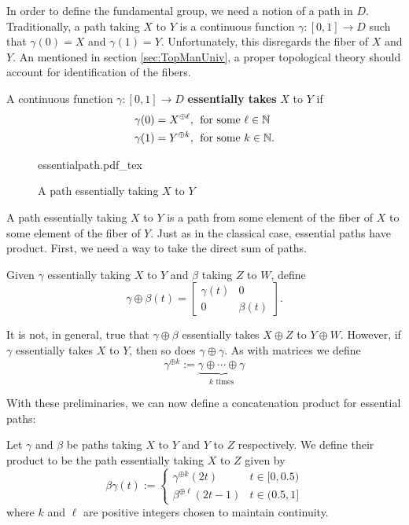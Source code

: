 In order to define the fundamental group, we need a notion of a path in \(D\).
Traditionally, a path taking \(X\) to \(Y\) is a continuous function
\(\gamma: [0,1]\to D\) such that \(\gamma(0)=X\) and \(\gamma(1)=Y\).
Unfortunately, this disregards the fiber of \(X\) and \(Y\). An mentioned in
section \ref{sec:TopManUniv}, a proper topological theory should account for
identification of the fibers.

\begin{definition}
  \label{def:esspath}
  A continuous function \(\gamma:[0,1]\to D\) \textbf{essentially takes} \(X\) to \(Y\) if
  \begin{align*}
    \gamma(0) = X^{\oplus \ell},& \;\text{ for some \(\ell \in \mathbb{N}\)}\\
    \gamma(1) = Y^{\oplus k},& \;\text{ for some \(k \in \mathbb{N}\)}.
  \end{align*}
\end{definition}

\begin{figure}[h!]
\centering
  \def\svgwidth{0.9\columnwidth}
  {essentialpath.pdf_tex}
\caption{A path essentially taking \(X\) to \(Y\)}
\label{fig:esspath}
\end{figure}
A path essentially taking \(X\) to \(Y\) is a path from some element of the
fiber of \(X\) to some element of the fiber of \(Y\). Just as in the classical
case, essential paths have product. First, we need a way to take the direct sum
of paths.

\begin{definition}%
  Given \(\gamma\) essentially taking \(X\) to \(Y\) and \(\beta\) taking \(Z\)
  to \(W\), define
  \[
    \gamma\oplus\beta(t) = \begin{bmatrix} \gamma(t)&0\\0&\beta(t) \end{bmatrix}.
  \]
\end{definition}

It is not, in general, true that \(\gamma\oplus\beta\) essentially takes
\(X\oplus Z\) to \(Y \oplus W\). However, if \(\gamma\) essentially takes \(X\)
to \(Y\), then so does \(\gamma\oplus\gamma\). As with matrices we define
\[
  \gamma^{\oplus k} := \underbrace{\gamma\oplus \cdots \oplus\gamma}_{k \text{ times}}
\]

With these preliminaries, we can now define a concatenation product for
essential paths:
\begin{definition}%
\label{def:concatprod}
  Let \(\gamma\) and \(\beta\) be paths taking \(X\) to \(Y\) and \(Y\) to \(Z\)
  respectively. We define their product to be the path essentially taking \(X\)
  to \(Z\) given by
  \[
    \beta\gamma(t) :=
    \begin{cases}
      \gamma^{\oplus k}(2t) & t \in [0,0.5) \\
      \beta^{\oplus\ell} (2t-1)& t \in (0.5,1]
    \end{cases}
  \]
  where \(k\) and \(\ell\) are positive integers chosen to maintain continuity.
\end{definition}

